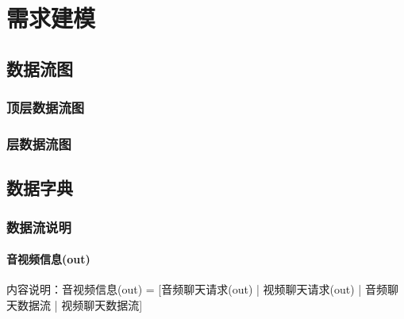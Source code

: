 \chapter{需求建模 }
    \section{数据流图}

        \subsection{顶层数据流图}

        \subsection{层数据流图}

    \section{数据字典}

        \subsection{数据流说明}
            
            \subsubsection{音视频信息(out)}
                内容说明：音视频信息(out) = [音频聊天请求(out) | 视频聊天请求(out) | 音频聊天数据流 | 视频聊天数据流]
